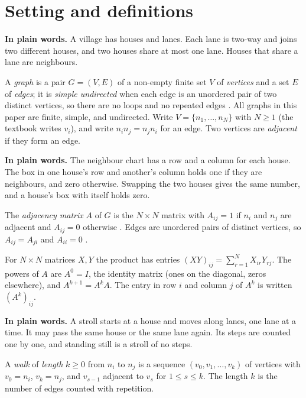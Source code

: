 \section{Setting and definitions}\label{sec:definitions}

\plainstart\textbf{In plain words.} A village has houses and lanes. Each lane is two-way and joins two different houses, and two houses share at most one lane. Houses that share a lane are neighbours.\plainend
\begin{definition}\label{def:graph}
A \emph{graph} is a pair $G = (V, E)$ of a non-empty finite set $V$ of \emph{vertices} and a set $E$ of \emph{edges}; it is \emph{simple undirected} when each edge is an unordered pair of two distinct vertices, so there are no loops and no repeated edges \cite[Definition 1.1.1, p.~9; Definition 1.1.4, p.~11]{petrosyan_graph_theory} \cite[Definition 1.1.1, p.~2]{galway_adjacency_notes}. All graphs in this paper are finite, simple, and undirected. Write $V = \{n_1, \dots, n_N\}$ with $N \ge 1$ (the textbook writes $v_i$), and write $n_i n_j = n_j n_i$ for an edge. Two vertices are \emph{adjacent} if they form an edge.
\end{definition}

\plainstart\textbf{In plain words.} The neighbour chart has a row and a column for each house. The box in one house's row and another's column holds one if they are neighbours, and zero otherwise. Swapping the two houses gives the same number, and a house's box with itself holds zero.\plainend
\begin{definition}\label{def:matrix}
The \emph{adjacency matrix} $A$ of $G$ is the $N \times N$ matrix with $A_{ij} = 1$ if $n_i$ and $n_j$ are adjacent and $A_{ij} = 0$ otherwise \cite[p.~11]{petrosyan_graph_theory}. Edges are unordered pairs of distinct vertices, so $A_{ij} = A_{ji}$ and $A_{ii} = 0$ \cite[p.~11]{petrosyan_graph_theory}.
\end{definition}

For $N \times N$ matrices $X, Y$ the product has entries $(XY)_{ij} = \sum_{r=1}^{N} X_{ir} Y_{rj}$. The powers of $A$ are $A^0 = I$, the identity matrix (ones on the diagonal, zeros elsewhere), and $A^{k+1} = A^k A$. The entry in row $i$ and column $j$ of $A^k$ is written $(A^k)_{ij}$.

\plainstart\textbf{In plain words.} A stroll starts at a house and moves along lanes, one lane at a time. It may pass the same house or the same lane again. Its steps are counted one by one, and standing still is a stroll of no steps.\plainend
\begin{definition}\label{def:walk}
A \emph{walk} of \emph{length} $k \ge 0$ from $n_i$ to $n_j$ is a sequence $(v_0, v_1, \dots, v_k)$ of vertices with $v_0 = n_i$, $v_k = n_j$, and $v_{s-1}$ adjacent to $v_s$ for $1 \le s \le k$. The length $k$ is the number of edges counted with repetition.
\end{definition}

